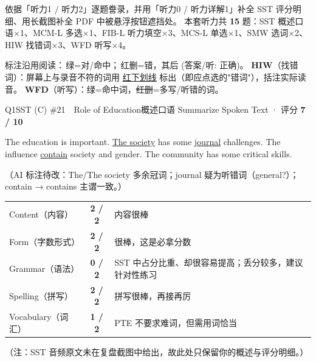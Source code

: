 
\vspace{1mm}
{\small\color{gray} 依据「听力1 / 听力2」逐题誊录，并用「听力0 / 听力详解1」补全 SST 评分明细、用长截图补全 PDF 中被悬浮按钮遮挡处。
本套听力共 \textbf{15} 题：SST 概述口语$\times$1、MCM-L 多选$\times$1、FIB-L 听力填空$\times$3、MCS-L 单选$\times$1、SMW 选词$\times$2、HIW 找错词$\times$3、WFD 听写$\times$4。}
\vspace{1mm}

\begin{notebox}
{\footnotesize 标注沿用阅读：{\color{cFix}\,绿=对/命中}；{\color{cWrong}\,红删=错}，其后 {\color{cFix}(答案/听: 正确)}。
\textbf{HIW}（找错词）：屏幕上与录音不符的词用 {\color{cWrong}\uline{红下划线}} 标出（即应点选的"错词"），括注实际读音。
\textbf{WFD}（听写）：{\color{cFix}绿}=命中词，{\color{cWrong}\sout{红删}}=多写/听错的词。}
\end{notebox}

\begin{qblock}{Q1\quad SST (C) \#21\ \ Role of Education}{概述口语 Summarize Spoken Text · 评分 \textcolor{cAccent}{\bfseries 7 / 10}}
\begin{promptbox}
The education is important. {\color{cAccent}\uline{The society}} has some {\color{cAccent}\uline{journal}} challenges. The influence {\color{cAccent}\uline{contain}} society and gender. The community has some critical skills.
\end{promptbox}
{\footnotesize\color{gray}（AI 标注待改：The/The society 多余冠词；journal 疑为听错词（general?）；contain → contains 主谓一致。）}
\begin{notebox}\small
\begin{tabular}{@{}lcl@{}}
Content（内容）& \textbf{2 / 2} & 内容很棒\\
Form（字数形式）& \textbf{2 / 2} & 很棒，这是必拿分数\\
Grammar（语法）& \textcolor{cWrong}{\bfseries 0 / 2} & SST 中占分比重、却很容易提高；丢分较多，建议针对性练习\\
Spelling（拼写）& \textbf{2 / 2} & 拼写很棒，再接再厉\\
Vocabulary（词汇）& \textbf{1 / 2} & PTE 不要求难词，但需用词恰当\\
\end{tabular}
\end{notebox}
{\footnotesize\color{gray}（注：SST 音频原文未在复盘截图中给出，故此处只保留你的概述与评分明细。）}
\end{qblock}

